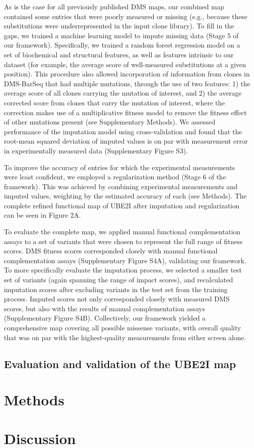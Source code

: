 As is the case for all previously published DMS maps, our combined map contained some entries that were poorly measured or missing (e.g., because these substitutions were underrepresented in the input clone library). To fill in the gaps, we trained a machine learning model to impute missing data (Stage 5 of our framework). Specifically, we trained a random forest regression model on a set of biochemical and structural features, as well as features intrinsic to our dataset (for example, the average score of well-measured substitutions at a given position). This procedure also allowed incorporation of information from clones in DMS-BarSeq that had multiple mutations, through the use of two features: 1) the average score of all clones carrying the mutation of interest, and 2) the average corrected score from clones that carry the mutation of interest, where the correction makes use of a multiplicative fitness model to remove the fitness effect of other mutations present (see Supplementary Methods). We assessed performance of the imputation model using cross-validation and found that the root-mean squared deviation of imputed values is on par with measurement error in experimentally measured data (Supplementary Figure S3).

To improve the accuracy of entries for which the experimental measurements were least confident, we employed a regularization method (Stage 6 of the framework).  This was achieved by combining experimental measurements and imputed values, weighting by the estimated accuracy of each (see Methods). The complete refined functional map of UBE2I after imputation and regularization can be seen in Figure 2A. 

To evaluate the complete map, we applied manual functional complementation assays to a set of variants that were chosen to represent the full range of fitness scores.  DMS fitness scores corresponded closely with manual functional complementation assays (Supplementary Figure S4A), validating our framework.  To more specifically evaluate the imputation process, we selected a smaller test set of variants (again spanning the range of impact scores), and recalculated imputation scores after excluding variants in the test set from the training process.  Imputed scores not only corresponded closely with measured DMS scores, but also with the results of manual complementation assays (Supplementary Figure S4B).  Collectively, our framework yielded a comprehensive map covering all possible missense variants, with overall quality that was on par with the highest-quality measurements from either screen alone.


\subsection{Evaluation and validation of the UBE2I map}

\section{Methods}

\section{Discussion}

